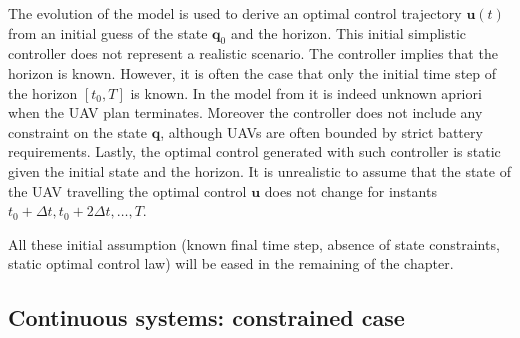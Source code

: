 The evolution of the model is used to derive an optimal control trajectory $\mathbf{u}(t)$ from an initial guess of the state $\mathbf{q}_0$ and the horizon. This initial simplistic controller does not represent a realistic scenario. The controller implies that the horizon is known. However, it is often the case that only the initial time step of the horizon $[t_0,T]$ is known. In the model from  it is indeed unknown apriori when the UAV plan terminates. Moreover the controller does not include any constraint on the state $\mathbf{q}$, although UAVs are often bounded by strict battery requirements. Lastly, the optimal control generated with such controller is static given the initial state and the horizon. It is unrealistic to assume that the state of the UAV travelling the optimal control $\mathbf{u}$ does not change for instants $t_0+\Delta t,t_0+2\Delta t,\dots,T$.

All these initial assumption (known final time step, absence of state constraints, static optimal control law) will be eased in the remaining of the chapter.

\subsection{\color{red}Continuous systems: constrained case}
\label{cp:opt:constrained}

